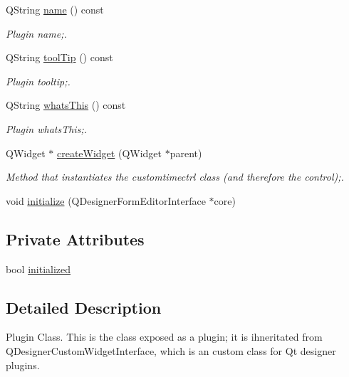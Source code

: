 \begin{DoxyCompactItemize}
QString \hyperlink{class_custom_time_ctrl_plugin_a4b34d287a8c4491229ee6e8bf6e9575a}{name} () const 
\begin{DoxyCompactList}\small\item\em Plugin name;. \item\end{DoxyCompactList}\item 
QString \hyperlink{class_custom_time_ctrl_plugin_a105774fa13b7f9df40f497aa582722df}{toolTip} () const 
\begin{DoxyCompactList}\small\item\em Plugin tooltip;. \item\end{DoxyCompactList}\item 
QString \hyperlink{class_custom_time_ctrl_plugin_aa37c7e879b0e8b6eb4e0e0ec32331dd6}{whatsThis} () const 
\begin{DoxyCompactList}\small\item\em Plugin whatsThis;. \item\end{DoxyCompactList}\item 
QWidget $\ast$ \hyperlink{class_custom_time_ctrl_plugin_aaf1a4b91242dab7caaa3194a54fa7cd3}{createWidget} (QWidget $\ast$parent)
\begin{DoxyCompactList}\small\item\em Method that instantiates the customtimectrl class (and therefore the control);. \item\end{DoxyCompactList}\item 
void \hyperlink{class_custom_time_ctrl_plugin_a71b6bce209cc6beff5ab3b6c12bcf1ab}{initialize} (QDesignerFormEditorInterface $\ast$core)
\end{DoxyCompactItemize}
\subsection*{Private Attributes}
\begin{DoxyCompactItemize}
\item 
bool \hyperlink{class_custom_time_ctrl_plugin_a7c04fd49d79c4936052dd81dcb9a2787}{initialized}
\end{DoxyCompactItemize}


\subsection{Detailed Description}
Plugin Class. This is the class exposed as a plugin; it is ihneritated from QDesignerCustomWidgetInterface, which is an custom class for Qt designer plugins. 

